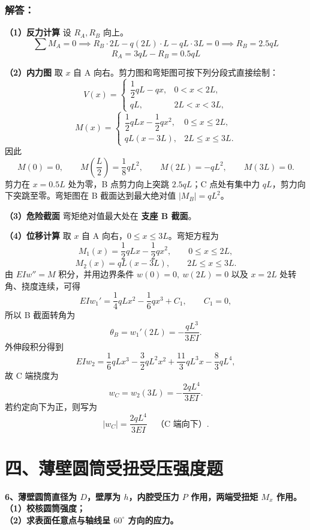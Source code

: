 \documentclass[11pt,a4paper]{ctexrep}
\begin{document}
{\subsubsection*{解答：}
\textbf{（1）反力计算}
设 $R_A, R_B$ 向上。
\[
    \sum M_A = 0 \implies R_B \cdot 2L - q(2L) \cdot L - qL \cdot 3L = 0 \implies R_B = 2.5 qL
\]
\[
    R_A = 3qL - R_B = 0.5 qL
\]

\textbf{（2）内力图}
取 $x$ 自 A 向右。剪力图和弯矩图可按下列分段式直接绘制：
\[
    V(x)=
    \begin{cases}
    \dfrac12qL-qx, & 0<x<2L,\\[4pt]
    qL, & 2L<x<3L,
    \end{cases}
\]
\[
    M(x)=
    \begin{cases}
    \dfrac12qLx-\dfrac12qx^2, & 0\le x\le 2L,\\[4pt]
    qL(x-3L), & 2L\le x\le 3L.
    \end{cases}
\]
因此
\[
    M(0)=0,\qquad
    M\!\left(\frac L2\right)=\frac18qL^2,\qquad
    M(2L)=-qL^2,\qquad
    M(3L)=0.
\]
剪力在 $x=0.5L$ 处为零，B 点剪力向上突跳 $2.5qL$；C 点处有集中力 $qL$，剪力向下突跳至零。弯矩图在 B 截面达到最大绝对值 $|M_B|=qL^2$。

\textbf{（3）危险截面}
弯矩绝对值最大处在 \textbf{支座 B 截面}。

\textbf{（4）位移计算}
取 $x$ 自 A 向右，$0\le x\le 3L$。弯矩方程为
\[
    M_1(x)=\frac{1}{2}qLx-\frac{1}{2}qx^2,\qquad 0\le x\le 2L,
\]
\[
    M_2(x)=qL(x-3L),\qquad 2L\le x\le 3L.
\]
由 $EIw''=M$ 积分，并用边界条件
$w(0)=0,\ w(2L)=0$ 以及 $x=2L$ 处转角、挠度连续，可得
\[
    EIw_1'=\frac{1}{4}qLx^2-\frac{1}{6}qx^3+C_1,
    \qquad C_1=0,
\]
所以 B 截面转角为
\[
    \theta_B=w_1'(2L)=-\frac{qL^3}{3EI}.
\]
外伸段积分得到
\[
    EIw_2=\frac{1}{6}qLx^3-\frac{3}{2}qL^2x^2+\frac{11}{3}qL^3x-\frac{8}{3}qL^4,
\]
故 C 端挠度为
\[
    w_C=w_2(3L)=-\frac{2qL^4}{3EI}.
\]
若约定向下为正，则写为
\[
    |w_C|=\frac{2qL^4}{3EI}\quad \text{（C 端向下）}.
\]




\section*{四、薄壁圆筒受扭受压强度题}

\textbf{6、薄壁圆筒直径为 $D$，壁厚为 $h$，内腔受压力 $P$ 作用，两端受扭矩 $M_x$ 作用。\\
（1）校核圆筒强度；\\
（2）求表面任意点与轴线呈 $60^\circ$ 方向的应力。}

}
\end{document}
